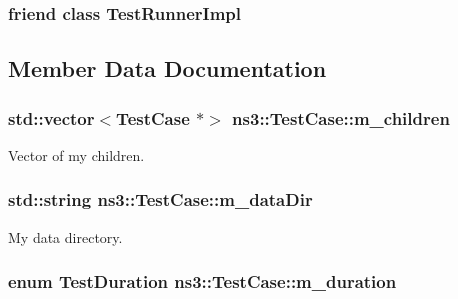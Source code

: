 \subsubsection[{\texorpdfstring{Test\+Runner\+Impl}{TestRunnerImpl}}]{\setlength{\rightskip}{0pt plus 5cm}friend class {\bf Test\+Runner\+Impl}\hspace{0.3cm}{\ttfamily [friend]}}\hypertarget{classns3_1_1TestCase_adebd005c0c7c24af2016237d7b6768f9}{}\label{classns3_1_1TestCase_adebd005c0c7c24af2016237d7b6768f9}


\subsection{Member Data Documentation}
\subsubsection[{\texorpdfstring{m\+\_\+children}{m_children}}]{\setlength{\rightskip}{0pt plus 5cm}std\+::vector$<${\bf Test\+Case} $\ast$$>$ ns3\+::\+Test\+Case\+::m\+\_\+children\hspace{0.3cm}{\ttfamily [private]}}\hypertarget{classns3_1_1TestCase_a69a286c12a0d13ba6ea0968d4ffb7058}{}\label{classns3_1_1TestCase_a69a286c12a0d13ba6ea0968d4ffb7058}


Vector of my children. 

\subsubsection[{\texorpdfstring{m\+\_\+data\+Dir}{m_dataDir}}]{\setlength{\rightskip}{0pt plus 5cm}std\+::string ns3\+::\+Test\+Case\+::m\+\_\+data\+Dir\hspace{0.3cm}{\ttfamily [private]}}\hypertarget{classns3_1_1TestCase_a204d14ebe231588cf07d0dae9b56015a}{}\label{classns3_1_1TestCase_a204d14ebe231588cf07d0dae9b56015a}


My data directory. 

\subsubsection[{\texorpdfstring{m\+\_\+duration}{m_duration}}]{\setlength{\rightskip}{0pt plus 5cm}enum {\bf Test\+Duration} ns3\+::\+Test\+Case\+::m\+\_\+duration\hspace{0.3cm}{\ttfamily [private]}}\hypertarget{classns3_1_1TestCase_a1437486460786c4bcb6ec5c45e067d9e}{}\label{classns3_1_1TestCase_a1437486460786c4bcb6ec5c45e067d9e}


